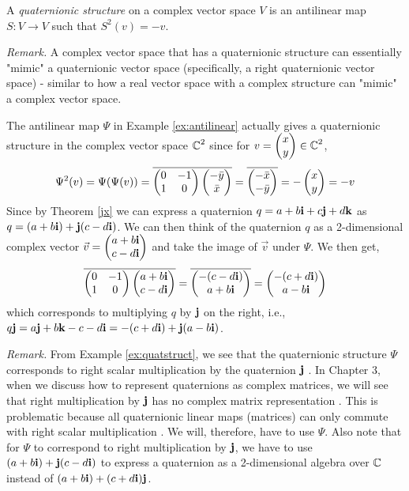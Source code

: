 \begin{definition} \label{def:quatstruct}
	\emph{\cite{jwr}} A \emph{quaternionic structure} on a complex vector space $V$ is an antilinear map $S: V \rightarrow V$ such that $S^2(v) = -v$.
\end{definition}

\textit{Remark.} A complex vector space that has a quaternionic structure can essentially "mimic" a quaternionic vector space (specifically, a right quaternionic vector space) \cite{jwr} - similar to how a real vector space with a complex structure can "mimic" a complex vector space.

\begin{ex} \label{ex:quatstruct}
	The antilinear map $\Psi$ in Example \ref{ex:antilinear} actually gives a quaternionic structure in the complex vector space $\operatorname{\mathbb{C}}^2$ since for $v = \begin{pmatrix} x \\ y \end{pmatrix} \in \operatorname{\mathbb{C}}^2$, 
	\begin{align*}
		\Psi^2(v) = \Psi(\Psi(v)) = 
		\overline{
		\begin{pmatrix}
			0 & -1 \\
			1 & 0
		\end{pmatrix}
		\begin{pmatrix} -\bar{y} \\ \bar{x} \end{pmatrix}}
		= \overline{\begin{pmatrix} -\bar{x} \\ -\bar{y} \end{pmatrix}}
		= -\begin{pmatrix} x \\ y \end{pmatrix} = -v
	\end{align*} 
	Since by Theorem \ref{jx} we can express a quaternion $q = a+b\textbf{i}+c\textbf{j}+d\textbf{k}$ as $q = (a+b\textbf{i})+\textbf{j}(c-d\textbf{i})$. We can then think of the quaternion $q$ as a 2-dimensional complex vector $\vec{v} = \begin{pmatrix} a+b\textbf{i} \\ c-d\textbf{i} \end{pmatrix}$ and take the image of $\vec{v}$ under $\Psi$. We then get,
	\begin{align*}
		\overline{
		\begin{pmatrix}
			0 & -1 \\
			1 & 0
		\end{pmatrix}
		\begin{pmatrix} a+b\textbf{i} \\ c-d\textbf{i} \end{pmatrix}
		} =
		\overline{
		\begin{pmatrix} -(c-d\textbf{i}) \\ a+b\textbf{i} \end{pmatrix}
		} =
		\begin{pmatrix} -(c+d\textbf{i}) \\ a-b\textbf{i} \end{pmatrix}
	\end{align*}
	which corresponds to multiplying $q$ by $\textbf{j}$ on the right, i.e., $q\textbf{j} = a\textbf{j} + b\textbf{k} - c - d\textbf{i} = -(c+d\textbf{i})+\textbf{j}(a-b\textbf{i})$.
\end{ex}

\textit{Remark.} From Example \ref{ex:quatstruct}, we see that the quaternionic structure $\Psi$ corresponds to right scalar multiplication by the quaternion $\textbf{j}$ \cite{aslaksen}. In Chapter 3, when we discuss how to represent quaternions as complex matrices, we will see that right multiplication by $\textbf{j}$ has no complex matrix representation \cite{aslaksen}. This is problematic because all quaternionic linear maps (matrices) can only commute with right scalar multiplication \cite{stack} \cite{aslaksen}. We will, therefore, have to use $\Psi$. Also note that for $\Psi$ to correspond to right multiplication by $\textbf{j}$, we have to use $(a+b\textbf{i})+\textbf{j}(c-d\textbf{i})$ to express a quaternion as a 2-dimensional algebra over $\operatorname{\mathbb{C}}$ instead of $(a+b\textbf{i})+(c+d\textbf{i})\textbf{j}$.

